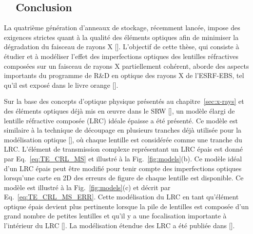 \begin{refsection}\renewcommand{\thechapter}{7.fr}
\chapter{~~Conclusion}\label{sec:conclusion_fr}

La quatrième génération d'anneaux de stockage, récemment lancée, impose des exigences strictes quant à la qualité des éléments optiques afin de minimiser la dégradation du faisceau de rayons X [\cite{Schroer2014,Yabashi2014}]. L'objectif de cette thèse, qui consiste à étudier et à modéliser l'effet des imperfections optiques des lentilles réfractives composées sur un faisceau de rayons X partiellement cohérent, aborde des aspects importants du programme de R\&D en optique des rayons X de l'ESRF-EBS, tel qu'il est exposé dans le livre orange [\cite{orangebook}]. 

Sur la base des concepts d'optique physique présentés au chapitre~\ref{sec:x-rays} et des éléments optiques déjà mis en œuvre dans le SRW [\cite{Baltser2011}], un modèle élargi de lentille réfractive composée (LRC) idéale épaisse a été présenté. Ce modèle est similaire à la technique de découpage en plusieurs tranches déjà utilisée pour la modélisation optique [\cite{Li2017,Ali2020}], où chaque lentille est considérée comme une tranche du LRC. L'élément de transmission complexe représentant un LRC épais est donné par Eq.~\ref{eq:TE_CRL_MS} et illustré à la Fig.~\ref{fig:models}(b). Ce modèle idéal d'un LRC épais peut être modifié pour tenir compte des imperfections optiques lorsqu'une carte en 2D des erreurs de figure de chaque lentille est disponible. Ce modèle est illustré à la Fig.~\ref{fig:models}(c) et décrit par Eq.~\ref{eq:TE_CRL_MS_ERR}. Cette modélisation du LRC en tant qu'élément optique épais devient plus pertinente lorsque la pile de lentilles est composée d'un grand nombre de petites lentilles et qu'il y a une focalisation importante à l'intérieur du LRC [\cite{Schroer2005}]. La modélisation étendue des LRC a été publiée dans [\cite{Celestre2020}].


\end{refsection}
